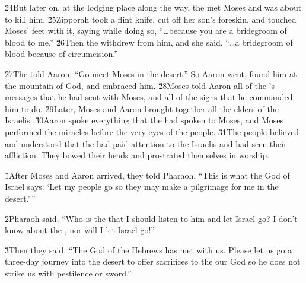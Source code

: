 \v{24}But later on, at the lodging place along the way, the  met Moses and was about to kill him. \v{25}Zipporah took a flint knife, cut off her son's foreskin, and touched Moses' feet with it, saying while doing so, ``{\ldots}because you are a bridegroom of blood to me.'' \v{26}Then the  withdrew from him, and she said, ``{\ldots}a bridegroom of blood because of circumcision.''

\v{27}The  told Aaron, ``Go meet Moses in the desert.'' So Aaron went, found him at the mountain of God, and embraced him. \v{28}Moses told Aaron all of the 's messages that he had sent with Moses, and all of the signs that he commanded him to do. \v{29}Later, Moses and Aaron brought together all the elders of the Israelis. \v{30}Aaron spoke everything that the  had spoken to Moses, and Moses performed the miracles before the very eyes of the people. \v{31}The people believed and understood that the  had paid attention to the Israelis and had seen their affliction. They bowed their heads and prostrated themselves in worship.

\v{1}After Moses and Aaron arrived, they told Pharaoh, ``This is what the  God of Israel says: `Let my people go so they may make a pilgrimage for me in the desert.'\,''

\v{2}Pharaoh said, ``Who is the  that I should listen to him and let Israel go? I don't know about the , nor will I let Israel go!''

\v{3}Then they said, ``The God of the Hebrews has met with us. Please let us go a three-day journey into the desert to offer sacrifices to the  our God so he does not strike us with pestilence or sword.''

